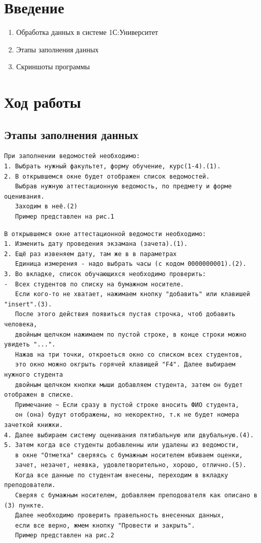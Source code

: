 \documentclass[12pt,a4paper]{scrartcl}
\begin{document}
\section{Введение}
\label{sec:intro}

\begin{enumerate}
 \item Обработка данных в системе 1С:Университет
 \item Этапы заполнения данных
 \item Скриншоты программы
\end{enumerate}
\section{Ход работы}
\label{sec:exp}

\subsection{Этапы заполнения данных}

\label{sec:exp:code}
\begin{verbatim}
При заполнении ведомостей необходимо:
1. Выбрать нужный факультет, форму обучение, курс(1-4).(1).
2. В открывшемся окне будет отображен список ведомостей.
   Выбрав нужную аттестационную ведомость, по предмету и форме оценивания.
   Заходим в неё.(2)
   Пример представлен на рис.1
\end{verbatim}
\begin{verbatim}
В открывшемся окне аттестационной ведомости необходимо:
1. Изменить дату проведения экзамана (зачета).(1). 
2. Ещё раз извеняем дату, там же в в параметрах 
   Единица измерения - надо выбрать часы (с кодом 0000000001).(2).
3. Во вкладке, список обучающихся необходимо проверить:
-  Всех студентов по списку на бумажном носителе.
   Если кого-то не хватает, нажимаем кнопку "добавить" или клавишей "insert".(3).   
   После этого действия появиться пустая строчка, чтоб добавить человека,
   двойным щелчком нажимаем по пустой строке, в конце строки можно увидеть "...".
   Нажав на три точки, откроеться окно со списком всех студентов,
   это окно можно окгрыть горячей клавищей "F4". Далее выбираем нужного студента
   двойным щелчком кнопки мыши добавляем студента, затем он будет отображен в списке.
   Примечание ~ Если сразу в пустой строке вносить ФИО студента,
   он (она) будут отображены, но некоректно, т.к не будет номера зачеткой книжки.
4. Далее выбираем систему оценивания пятибальную или двубальную.(4).   
5. Затем когда все студенты добавленны или удалены из ведомости,
   в окне "Отметка" сверяясь с бумажным носителем вбиваем оценки,
   зачет, незачет, неявка, удовлетворительно, хорошо, отлично.(5).
   Когда все данные по студентам внесены, переходим в вкладку преподователи.
   Сверяя с бумажным носителем, добавляем преподователя как описано в (3) пункте.
   Далее необходимо проверить правельность внесенных данных,
   если все верно, жмем кнопку "Провести и закрыть".
   Пример представлен на рис.2
\end{verbatim}
\end{document}
